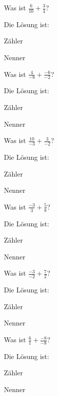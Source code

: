 \documentclass{ximera}
\begin{document}
\begin{shuffle}
\begin{question}
Was ist $\frac{6}{10} + \frac{3}{4}$?
\begin{solution}
Die Lösung ist:

Zähler 

Nenner 
\end{solution}
\end{question}


\begin{question}
Was ist $\frac{4}{-8} + \frac{-6}{-2}$?
\begin{solution}
Die Lösung ist:

Zähler 

Nenner 
\end{solution}
\end{question}


\begin{question}
Was ist $\frac{10}{-3} + \frac{3}{-2}$?
\begin{solution}
Die Lösung ist:

Zähler 

Nenner 
\end{solution}
\end{question}


\begin{question}
Was ist $\frac{-3}{3} + \frac{5}{8}$?
\begin{solution}
Die Lösung ist:

Zähler 

Nenner 
\end{solution}
\end{question}


\begin{question}
Was ist $\frac{-3}{-2} + \frac{7}{2}$?
\begin{solution}
Die Lösung ist:

Zähler 

Nenner 
\end{solution}
\end{question}


\begin{question}
Was ist $\frac{6}{1} + \frac{-8}{-8}$?
\begin{solution}
Die Lösung ist:

Zähler 

Nenner 
\end{solution}
\end{question}



\end{shuffle}
\end{document}

